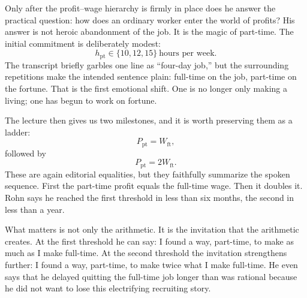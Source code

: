 Only after the profit--wage hierarchy is firmly in place does he answer the practical question: how does an ordinary worker enter the world of profits? His answer is not heroic abandonment of the job. It is the magic of part-time. The initial commitment is deliberately modest:
\begin{equation}
h_{\mathrm{pt}} \in \{10,12,15\}\ \text{hours per week}.
\end{equation}
The transcript briefly garbles one line as ``four-day job,'' but the surrounding repetitions make the intended sentence plain: full-time on the job, part-time on the fortune. That is the first emotional shift. One is no longer only making a living; one has begun to work on fortune.

The lecture then gives us two milestones, and it is worth preserving them as a ladder:
\begin{equation}
P_{\mathrm{pt}} = W_{\mathrm{ft}},
\end{equation}
followed by
\begin{equation}
P_{\mathrm{pt}} = 2W_{\mathrm{ft}}.
\end{equation}
These are again editorial equalities, but they faithfully summarize the spoken sequence. First the part-time profit equals the full-time wage. Then it doubles it. Rohn says he reached the first threshold in less than six months, the second in less than a year.

\begin{figure}[t]
\centering
{}
\end{figure}

What matters is not only the arithmetic. It is the invitation that the arithmetic creates. At the first threshold he can say: I found a way, part-time, to make as much as I make full-time. At the second threshold the invitation strengthens further: I found a way, part-time, to make twice what I make full-time. He even says that he delayed quitting the full-time job longer than was rational because he did not want to lose this electrifying recruiting story.


